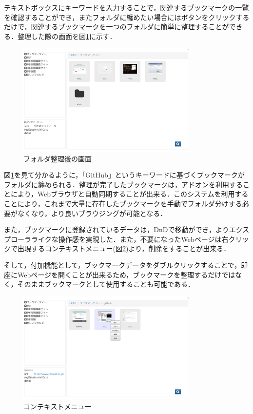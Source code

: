 \documentclass[a4paper,10pt,fleqn]{jsarticle}
\begin{document}
テキストボックスにキーワードを入力することで，関連するブックマークの一覧を確認することができ，またフォルダに纏めたい場合にはボタンをクリックするだけで，関連するブックマークを一つのフォルダに簡単に整理することができる．整理した際の画面を図\ref{fig:prot3}に示す．

\begin{figure}[h]
  \begin{center}
    \includegraphics[width=9.0cm]{./prot3.png}
    \caption{フォルダ整理後の画面}
    \label{fig:prot3}
  \end{center}
\end{figure}

\newpage

図\ref{fig:prot3}を見て分かるように，「GitHub」というキーワードに基づくブックマークがフォルダに纏められる．整理が完了したブックマークは，アドオンを利用することにより，Webブラウザと自動同期することが出来る．このシステムを利用することにより，これまで大量に存在したブックマークを手動でフォルダ分けする必要がなくなり，より良いブラウジングが可能となる．

また，ブックマークに登録されているデータは，DnDで移動ができ，よりエクスプローラライクな操作感を実現した．また，不要になったWebページは右クリックで出現するコンテキストメニュー(図\ref{fig:prot4})より，削除をすることが出来る．

そして，付加機能として，ブックマークデータをダブルクリックすることで，即座にWebページを開くことが出来るため，ブックマークを整理するだけではなく，そのままブックマークとして使用することも可能である．

\begin{figure}[h]
  \begin{center}
    \includegraphics[width=9.0cm]{./prot4.png}
    \caption{コンテキストメニュー}
    \label{fig:prot4}
  \end{center}
\end{figure}
\end{document}
